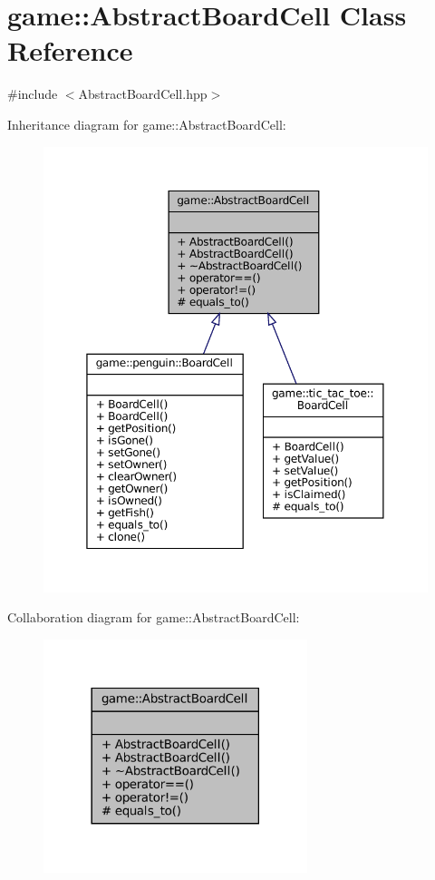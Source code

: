 \hypertarget{classgame_1_1_abstract_board_cell}{}\section{game\+:\+:Abstract\+Board\+Cell Class Reference}
\label{classgame_1_1_abstract_board_cell}


{\ttfamily \#include $<$Abstract\+Board\+Cell.\+hpp$>$}



Inheritance diagram for game\+:\+:Abstract\+Board\+Cell\+:
\nopagebreak
\begin{figure}[H]
\begin{center}
\leavevmode
\includegraphics[width=350pt]{classgame_1_1_abstract_board_cell__inherit__graph}
\end{center}
\end{figure}


Collaboration diagram for game\+:\+:Abstract\+Board\+Cell\+:
\nopagebreak
\begin{figure}[H]
\begin{center}
\leavevmode
\includegraphics[width=218pt]{classgame_1_1_abstract_board_cell__coll__graph}
\end{center}
\end{figure}
